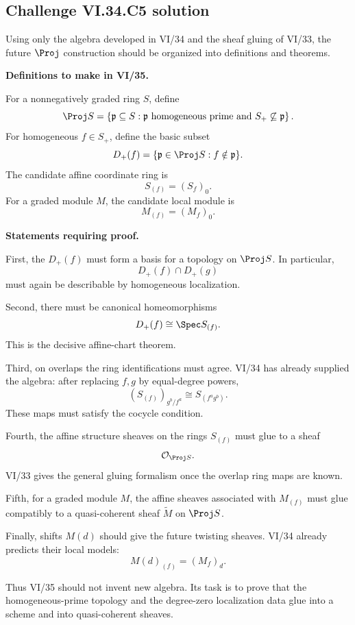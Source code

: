 \subsection*{Challenge VI.34.C5 solution}
\begin{solution}
Using only the algebra developed in VI/34 and the sheaf gluing of VI/33, the future \(\Proj\) construction should
be organized into definitions and theorems.

\textbf{Definitions to make in VI/35.}

For a nonnegatively graded ring \(S\), define
\[
\Proj S
=
\left\{
\mathfrak p\subseteq S:
\mathfrak p\text{ homogeneous prime and }S_+\not\subseteq\mathfrak p
\right\}.
\]
For homogeneous \(f\in S_+\), define the basic subset
\[
D_+(f)
=
\{\mathfrak p\in\Proj S:f\notin\mathfrak p\}.
\]
The candidate affine coordinate ring is
\[
\boxed{S_{(f)}=(S_f)_0}.
\]
For a graded module \(M\), the candidate local module is
\[
\boxed{M_{(f)}=(M_f)_0}.
\]

\textbf{Statements requiring proof.}

First, the \(D_+(f)\) must form a basis for a topology on \(\Proj S\). In particular,
\[
D_+(f)\cap D_+(g)
\]
must again be describable by homogeneous localization.

Second, there must be canonical homeomorphisms
\[
D_+(f)\cong\Spec S_{(f)}.
\]
This is the decisive affine-chart theorem.

Third, on overlaps the ring identifications must agree. VI/34 has already supplied the algebra:
after replacing \(f,g\) by equal-degree powers,
\[
(S_{(f)})_{g^b/f^a}
\cong
S_{(f^ag^b)}.
\]
These maps must satisfy the cocycle condition.

Fourth, the affine structure sheaves on the rings \(S_{(f)}\) must glue to a sheaf
\[
\mathcal O_{\Proj S}.
\]
VI/33 gives the general gluing formalism once the overlap ring maps are known.

Fifth, for a graded module \(M\), the affine sheaves associated with \(M_{(f)}\) must glue compatibly to a
quasi-coherent sheaf \(\widetilde M\) on \(\Proj S\).

Finally, shifts \(M(d)\) should give the future twisting sheaves. VI/34 already predicts their local models:
\[
M(d)_{(f)}=(M_f)_d.
\]

Thus VI/35 should not invent new algebra. Its task is to prove that the homogeneous-prime topology and the
degree-zero localization data glue into a scheme and into quasi-coherent sheaves.
\end{solution}
